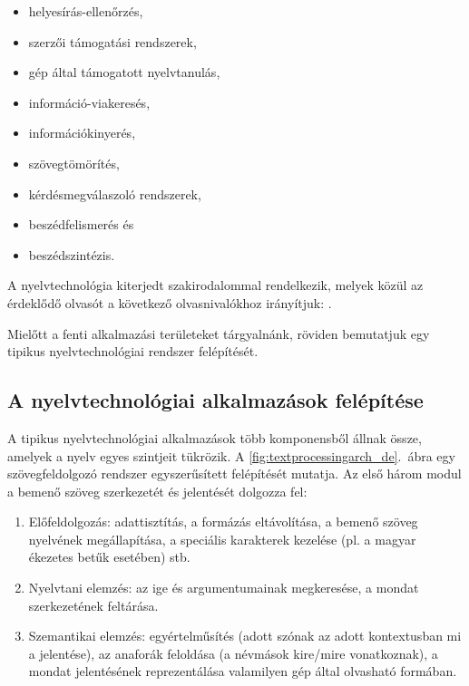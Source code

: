 \begin{multicols}{2}
\begin{itemize}
      \item helyesírás-ellenőrzés,
      \item szerzői támogatási rendszerek,
      \item gép által támogatott nyelvtanulás,
      \item információ-viakeresés, 
      \item információkinyerés,
      \item szövegtömörítés,
      \item kérdésmegválaszoló rendszerek,
      \item beszédfelismerés és
      \item beszédszintézis.
    \end{itemize}

A nyelvtechnológia kiterjedt szakirodalommal rendelkezik, melyek közül az érdeklődő olvasót a következő olvasnivalókhoz irányítjuk: \cite{jurafsky-martin01} \cite{manning-schuetze1} \cite{lt-world1} \cite{lt-survey1}.

Mielőtt a fenti alkalmazási területeket tárgyalnánk, röviden bemutatjuk egy tipikus nyelvtechnológiai rendszer felépítését. 

\subsection{A nyelvtechnológiai alkalmazások felépítése}

A tipikus nyelvtechnológiai alkalmazások több komponensből állnak össze, amelyek a nyelv egyes szintjeit tükrözik. A \ref{fig:textprocessingarch_de}.~ábra egy szövegfeldolgozó rendszer egyszerűsített felépítését mutatja. Az első három modul a bemenő szöveg szerkezetét és jelentését dolgozza fel:

\begin{enumerate}
      \item Előfeldolgozás: adattisztítás, a formázás eltávolítása, a bemenő szöveg nyelvének megállapítása, a speciális karakterek kezelése (pl. a magyar ékezetes betűk esetében) stb.
      \item Nyelvtani elemzés: az ige és argumentumainak megkeresése, a mondat szerkezetének feltárása.
      \item Szemantikai elemzés: egy\-ér\-tel\-mű\-sí\-tés (adott szónak az adott kontextusban mi a jelentése), az anaforák feloldása (a névmások kire/mire vonatkoznak), a mondat jelentésének reprezentálása valamilyen gép által olvasható formában. 
    \end{enumerate}


\end{multicols}
